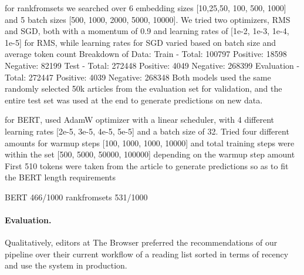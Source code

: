 for rankfromsets we searched over 6 embedding sizes [10,25,50, 100, 500, 1000] and 5 batch sizes [500, 1000, 2000, 5000, 10000]. We tried two optimizers, RMS and SGD, both with a momentum of 0.9 and learning rates of [1e-2, 1e-3, 1e-4, 1e-5] for RMS, while learning rates for SGD varied based on batch size and average token count
Breakdown of Data: Train -      Total: 100797            Positive: 18598                 Negative: 82199
Test -      Total: 272448          Positive: 4049                  Negative: 268399
Evaluation -      Total: 272447            Positive: 4039                  Negative: 268348
Both models used the same randomly selected 50k articles from the evaluation set for validation, and the entire test set was used at the end to generate predictions on new data.

for BERT, used AdamW optimizer with a linear scheduler, with 4 different learning rates [2e-5, 3e-5, 4e-5, 5e-5] and a batch size of 32. Tried four different amounts for warmup steps [100, 1000, 1000, 10000] and total training steps were within the set [500, 5000, 50000, 100000] depending on the warmup step amount
First 510 tokens were taken from the article to generate predictions so as to fit the BERT length requirements




BERT 466/1000
rankfromsets 531/1000

\paragraph{Evaluation.} Qualitatively, editors at The Browser preferred the recommendations of our pipeline over their current workflow of a reading list sorted in terms of recency and use the system in production.